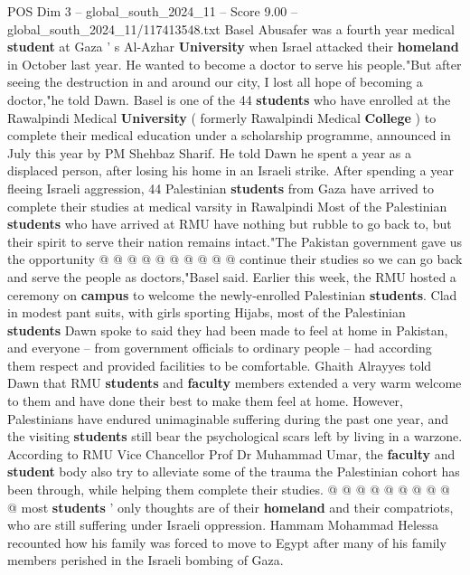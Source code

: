 \begin{textsample}{POS Dim 3 – global\_south\_2024\_11 – Score 9.00 – global\_south\_2024\_11/117413548.txt}  \label{ex:f3_pos_305}
Basel Abusafer was a fourth year medical \textbf{student} at Gaza ' s Al-Azhar \textbf{University} when Israel attacked their \textbf{homeland} in October last year.
He wanted to become a doctor to serve his people."But after seeing the destruction in and around our city, I lost all hope of becoming a doctor,"he told Dawn.
Basel is one of the 44 \textbf{students} who have enrolled at the Rawalpindi Medical \textbf{University} ( formerly Rawalpindi Medical \textbf{College} ) to complete their medical education under a scholarship programme, announced in July this year by PM Shehbaz Sharif.
He told Dawn he spent a year as a displaced person, after losing his home in an Israeli strike.
After spending a year fleeing Israeli aggression, 44 Palestinian \textbf{students} from Gaza have arrived to complete their studies at medical varsity in Rawalpindi Most of the Palestinian \textbf{students} who have arrived at RMU have nothing but rubble to go back to, but their spirit to serve their nation remains intact."The Pakistan government gave us the opportunity @ @ @ @ @ @ @ @ @ @ continue their studies so we can go back and serve the people as doctors,"Basel said.
Earlier this week, the RMU hosted a ceremony on \textbf{campus} to welcome the newly-enrolled Palestinian \textbf{students}.
Clad in modest pant suits, with girls sporting Hijabs, most of the Palestinian \textbf{students} Dawn spoke to said they had been made to feel at home in Pakistan, and everyone -- from government officials to ordinary people -- had according them respect and provided facilities to be comfortable.
Ghaith Alrayyes told Dawn that RMU \textbf{students} and \textbf{faculty} members extended a very warm welcome to them and have done their best to make them feel at home.
However, Palestinians have endured unimaginable suffering during the past one year, and the visiting \textbf{students} still bear the psychological scars left by living in a warzone.
According to RMU Vice Chancellor Prof Dr Muhammad Umar, the \textbf{faculty} and \textbf{student} body also try to alleviate some of the trauma the Palestinian cohort has been through, while helping them complete their studies. @ @ @ @ @ @ @ @ @ @ most \textbf{students} ' only thoughts are of their \textbf{homeland} and their compatriots, who are still suffering under Israeli oppression.
Hammam Mohammad Helessa recounted how his family was forced to move to Egypt after many of his family members perished in the Israeli bombing of Gaza.

\end{textsample}
